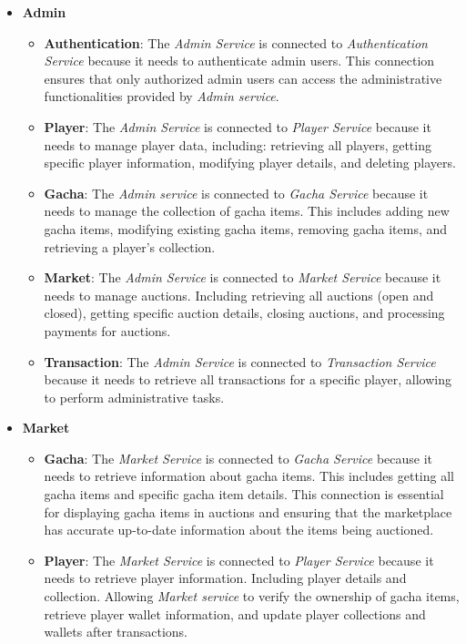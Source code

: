 \documentclass{article}
\begin{document}
\begin{itemize}
    \item \textbf{Admin}
        \begin{itemize}
            \item \textbf{Authentication}: The \emph{Admin Service} is connected to \emph{Authentication Service} because it needs to authenticate admin users. This connection ensures that only authorized admin users can access the administrative functionalities provided by \emph{Admin service}.
            \item \textbf{Player}: The \emph{Admin Service} is connected to \emph{Player Service} because it needs to manage player data, including: retrieving all players, getting specific player information, modifying player details, and deleting players.
            \item \textbf{Gacha}: The \emph{Admin service} is connected to \emph{Gacha Service} because it needs to manage the collection of gacha items. This includes adding new gacha items, modifying existing gacha items, removing gacha items, and retrieving a player's collection.
            \item \textbf{Market}: The \emph{Admin Service} is connected to \emph{Market Service} because it needs to manage auctions. Including retrieving all auctions (open and closed), getting specific auction details, closing auctions, and processing payments for auctions.
            \item \textbf{Transaction}: The \emph{Admin Service} is connected to \emph{Transaction Service} because it needs to retrieve all transactions for a specific player, allowing to perform administrative tasks.
        \end{itemize} 
    \item \textbf{Market}
        \begin{itemize}
            \item \textbf{Gacha}: The \emph{Market Service} is connected to \emph{Gacha Service} because it needs to retrieve information about gacha items. This includes getting all gacha items and specific gacha item details. This connection is essential for displaying gacha items in auctions and ensuring that the marketplace has accurate  up-to-date information about the items being auctioned.
            \item \textbf{Player}: The \emph{Market Service} is connected to \emph{Player Service} because it needs to retrieve player information. Including player details and  collection. Allowing  \emph{Market service} to verify the ownership of gacha items, retrieve player wallet information, and update player collections and wallets after transactions.

\end{itemize}
\end{itemize}
\end{document}
